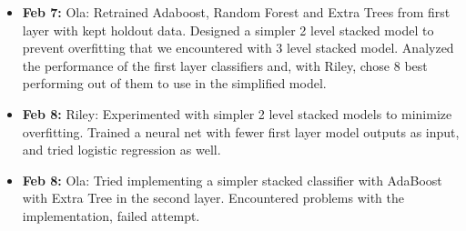 \begin{itemize}
\begin{itemize}
    \item \textbf{Feb 7:} Ola: Retrained Adaboost, Random Forest and Extra Trees from first layer with kept holdout data. Designed a simpler 2 level stacked model to prevent overfitting that we encountered with 3 level stacked model. Analyzed the performance of the first layer classifiers and, with Riley, chose 8 best performing out of them to use in the simplified model.
    \item \textbf{Feb 8:} Riley: Experimented with simpler 2 level stacked models to minimize overfitting. Trained a neural net with fewer first layer model outputs as input, and tried logistic regression as well.
    \item \textbf{Feb 8:} Ola: Tried implementing a simpler stacked classifier with AdaBoost with Extra Tree in the second layer. Encountered problems with the implementation, failed attempt.
    \end{itemize}

\end{itemize}



